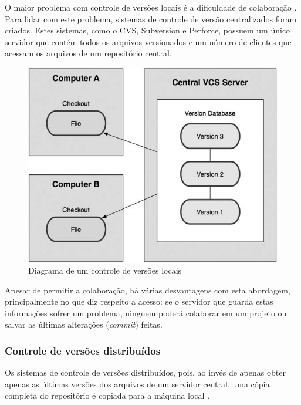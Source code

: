 O maior problema com controle de versões locais é a dificuldade de colaboração \cite[p. 3]{progit}. Para lidar com este problema, sistemas de controle de versão centralizados foram criados. Estes sistemas, como o CVS, Subversion e Perforce, possuem um único servidor que contém todos os arquivos versionados e um número de clientes que acessam os arquivos de um repositório central.

\begin{figure} [ht]
	\centering
	\includegraphics[scale=0.4]{central_version_control.png}
	\caption{Diagrama de um controle de versões locais \cite[p. 2]{progit}}
	\label{central_version_control}
\end{figure}

Apesar de permitir a colaboração, há várias desvantagens com esta abordagem, principalmente no que diz respeito a acesso: se o servidor que guarda estas informações sofrer um problema, ninguem poderá colaborar em um projeto ou salvar as últimas alterações (\emph{commit}) feitas.

\subsubsection{Controle de versões distribuídos}

Os sistemas de controle de versões distribuídos, pois, ao invés de apenas obter apenas as últimas versões dos arquivos de um servidor central, uma cópia completa do repositório é copiada para a máquina local \cite[p. 4]{progit}.

